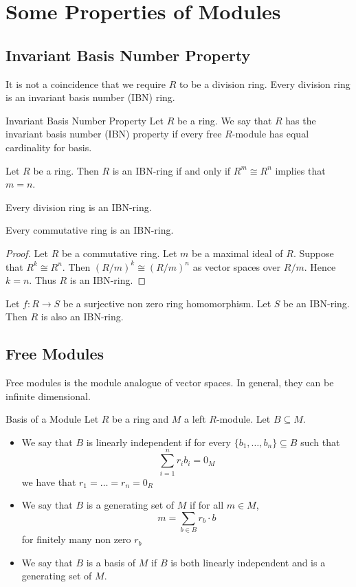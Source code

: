 \documentclass[a4paper]{article}
\begin{document}
\pagebreak
\section{Some Properties of Modules}
\subsection{Invariant Basis Number Property}
It is not a coincidence that we require $R$ to be a division ring. Every division ring is an invariant basis number (IBN) ring. 

\begin{defn}{Invariant Basis Number Property}{} Let $R$ be a ring. We say that $R$ has the invariant basis number (IBN) property if every free $R$-module has equal cardinality for basis. 
\end{defn}

\begin{prp}{}{} Let $R$ be a ring. Then $R$ is an IBN-ring if and only if $R^m\cong R^n$ implies that $m=n$. 
\end{prp}

\begin{prp}{}{} Every division ring is an IBN-ring. 
\end{prp}

\begin{prp}{}{} Every commutative ring is an IBN-ring. 
\begin{proof}
Let $R$ be a commutative ring. Let $m$ be a maximal ideal of $R$. Suppose that $R^k\cong R^n$. Then $(R/m)^k\cong(R/m)^n$ as vector spaces over $R/m$. Hence $k=n$. Thus $R$ is an IBN-ring. 
\end{proof}
\end{prp}

\begin{prp}{}{} Let $f:R\to S$ be a surjective non zero ring homomorphism. Let $S$ be an IBN-ring. Then $R$ is also an IBN-ring. 
\end{prp}

\subsection{Free Modules}
Free modules is the module analogue of vector spaces. In general, they can be infinite dimensional. 

\begin{defn}{Basis of a Module}{} Let $R$ be a ring and $M$ a left $R$-module. Let $B\subseteq M$. 
\begin{itemize}
\item We say that $B$ is linearly independent if for every $\{b_1,\dots,b_n\}\subseteq B$ such that $$\sum_{i=1}^nr_ib_i=0_M$$ we have that $r_1=\dots=r_n=0_R$
\item We say that $B$ is a generating set of $M$ if for all $m\in M$, $$m=\sum_{b\in B}r_b\cdot b$$ for finitely many non zero $r_b$
\item We say that $B$ is a basis of $M$ if $B$ is both linearly independent and is a generating set of $M$. 
\end{itemize}
\end{defn}
\end{document}
